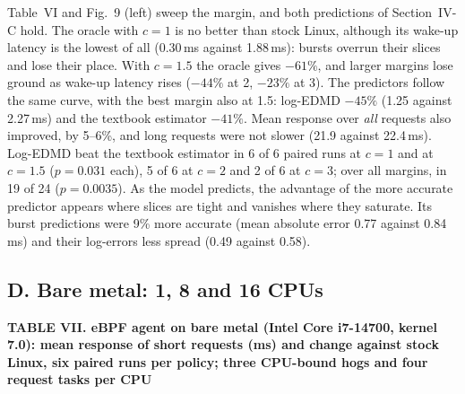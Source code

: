 \documentclass{article}
\begin{document}
Table~VI and Fig.~9 (left) sweep the margin, and both predictions of Section~IV-C hold. The oracle with $c=1$ is no better than stock Linux, although its wake-up latency is the lowest of all (0.30\,ms against 1.88\,ms): bursts overrun their slices and lose their place. With $c=1.5$ the oracle gives $-61\%$, and larger margins lose ground as wake-up latency rises ($-44\%$ at 2, $-23\%$ at 3). The predictors follow the same curve, with the best margin also at 1.5: log-EDMD $-45\%$ (1.25 against 2.27\,ms) and the textbook estimator $-41\%$. Mean response over \emph{all} requests also improved, by 5--6\%, and long requests were not slower (21.9 against 22.4\,ms). Log-EDMD beat the textbook estimator in 6 of 6 paired runs at $c=1$ and at $c=1.5$ ($p=0.031$ each), 5 of 6 at $c=2$ and 2 of 6 at $c=3$; over all margins, in 19 of 24 ($p=0.0035$). As the model predicts, the advantage of the more accurate predictor appears where slices are tight and vanishes where they saturate. Its burst predictions were 9\% more accurate (mean absolute error 0.77 against 0.84\,ms) and their log-errors less spread (0.49 against 0.58).

\subsection*{D. Bare metal: 1, 8 and 16 CPUs}


\textbf{TABLE VII. eBPF agent on bare metal (Intel Core i7-14700, kernel 7.0): mean response of short requests (ms) and change against stock Linux, six paired runs per policy; three CPU-bound hogs and four request tasks per CPU}
\end{document}
